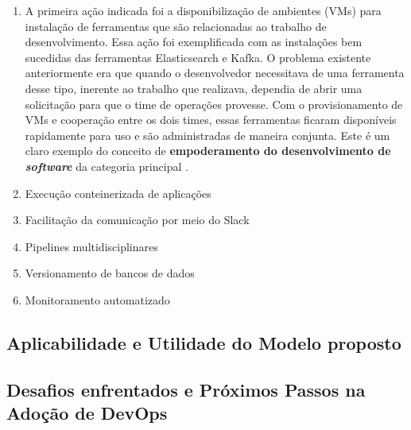 \begin{enumerate}
\item A primeira ação indicada foi a disponibilização de ambientes (\acrshort{VM}s)
para instalação de ferramentas que são relacionadas ao trabalho de
desenvolvimento. Essa ação foi exemplificada com as instalações bem sucedidas
das ferramentas Elasticsearch e Kafka. O problema existente anteriormente era
que quando o desenvolvedor necessitava de uma ferramenta desse tipo, inerente
ao trabalho que realizava, dependia de abrir uma solicitação para que o time
de operações provesse. Com o provisionamento de \acrshort{VM}s e cooperação
entre os dois times, essas ferramentas ficaram disponíveis rapidamente para uso
e são administradas de maneira conjunta. Este é um claro exemplo do conceito de
{\bf empoderamento do desenvolvimento de \emph{software}} da categoria principal
.

\item Execução conteinerizada de aplicações

\item Facilitação da comunicação por meio do Slack

\item Pipelines multidisciplinares

\item Versionamento de bancos de dados

\item Monitoramento automatizado

\end{enumerate}
\subsection{Aplicabilidade e Utilidade do Modelo proposto}

\subsection{Desafios enfrentados e Próximos Passos na Adoção de DevOps}

